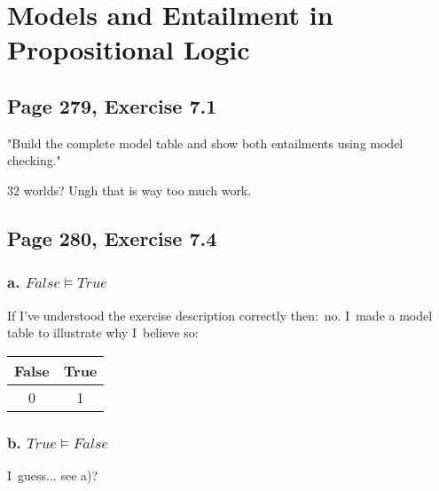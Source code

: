 \documentclass{article}
\begin{document}
\setcounter{secnumdepth}{2} %




\section{Models and Entailment in Propositional Logic}

\subsection{Page 279, Exercise 7.1}

"Build the complete model table and show both entailments using model
checking."

32 worlds? Ungh that is way too much work.

\subsection{Page 280, Exercise 7.4}

\subsubsection{a. $False\models True$}

If I've understood the exercise description correctly then:\ no. I\ made a
model table to illustrate why I\ believe so:

\begin{tabular}{|c|c|}
\hline
False & True \\ \hline
0 & 1 \\ \hline
\end{tabular}

\subsubsection{b. $True\models False$}

I\ guess... see a)?
\end{document}
